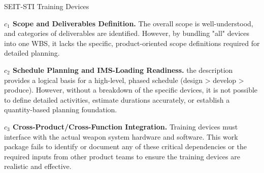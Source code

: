 %
\begin{frame}{SEIT-STI Training Devices}
\begin{minipage}{0.90\textwidth}
\raggedright
\fontsize{8}{9.5}\selectfont
\textbf{\(c_1\) Scope and Deliverables Definition.}
The overall scope is well-understood, and categories of deliverables are identified. However, by bundling "all" devices into one WBS, it lacks the specific, product-oriented scope definitions required for detailed planning.\par\vspace{0.6em}
\textbf{\(c_2\) Schedule Planning and IMS-Loading Readiness.}
the description provides a logical basis for a high-level, phased schedule (design > develop > produce). However, without a breakdown of the specific devices, it is not possible to define detailed activities, estimate durations accurately, or establish a quantity-based planning foundation.\par\vspace{0.6em}
\textbf{\(c_3\) Cross-Product/Cross-Function Integration.}
Training devices must interface with the actual weapon system hardware and software. This work package fails to identify or document any of these critical dependencies or the required inputs from other product teams to ensure the training devices are realistic and effective.\par\vspace{0.6em}
\end{minipage}
\end{frame}

\endinput
